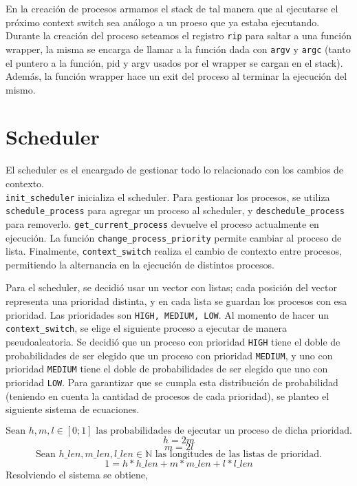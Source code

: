 \documentclass{article}
\begin{document}
En la creación de procesos armamos el stack de tal manera que al ejecutarse el próximo context switch sea análogo a un proeso que ya estaba ejecutando. Durante la creación del proceso seteamos el registro \texttt{rip} para saltar a una función wrapper, la misma se encarga de llamar a la función dada con \texttt{argv} y \texttt{argc} (tanto el puntero a la función, pid y argv usados por el wrapper se cargan en el stack). Además, la función wrapper hace un exit del proceso al terminar la ejecución del mismo.

\section {Scheduler}
El scheduler es el encargado de gestionar todo lo relacionado con los cambios de contexto. \\ \texttt{init\_scheduler} inicializa el scheduler. Para gestionar los procesos, se utiliza \texttt{schedule\_process} para agregar un proceso al scheduler, y \texttt{deschedule\_process} para removerlo. \texttt{get\_current\_process} devuelve el proceso actualmente en ejecución. La función \texttt{change\_process\_priority} permite cambiar al proceso de lista. Finalmente, \texttt{context\_switch} realiza el cambio de contexto entre procesos, permitiendo la alternancia en la ejecución de distintos procesos.

Para el scheduler, se decidió usar un vector con listas; cada posición del vector representa una prioridad distinta, y en cada lista se guardan los procesos con esa prioridad. Las prioridades son \texttt{HIGH, MEDIUM, LOW}.
Al momento de hacer un \texttt{context\_switch}, se elige el siguiente proceso a ejecutar de manera pseudoaleatoria. Se decidió que un proceso con prioridad \texttt{HIGH} tiene el doble de probabilidades de ser elegido que un proceso con prioridad \texttt{MEDIUM}, y uno con prioridad \texttt{MEDIUM} tiene el doble de probabilidades de ser elegido que uno con prioridad \texttt{LOW}. Para garantizar que se cumpla esta distribución de probabilidad (teniendo en cuenta la cantidad de procesos de cada prioridad), se planteo el siguiente sistema de ecuaciones.

\begin{equation*}
\text{Sean } h, m, l \in [0; 1] \text{ las probabilidades de ejecutar un proceso de dicha prioridad.}
\end{equation*}
\begin{equation*}
h = 2m
\end{equation*}
\begin{equation*}
m = 2l
\end{equation*}
\begin{equation*}
\text{Sean } h\_len, m\_len, l\_len \in \mathbb{N} \text{ las longitudes de las listas de prioridad.}
\end{equation*}
\begin{equation*}
1 = h * h\_len + m * m\_len + l * l\_len
\end{equation*}
Resolviendo el sistema se obtiene,
\end{document}
